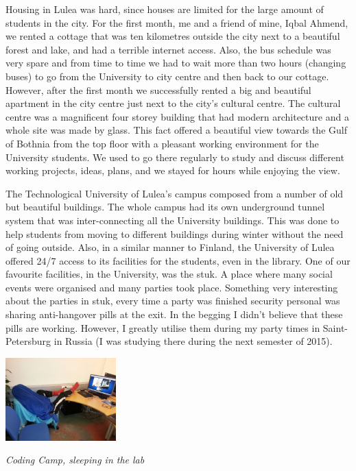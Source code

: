\documentclass[10pt,a4paper]{article} %
\begin{document}
\begin{multicols}{3}
Housing in Lulea was hard, since houses are limited for the large amount of 
students in the city. 
For the first month, me and a friend of mine, Iqbal Ahmend, we rented a cottage 
that was ten kilometres outside the city next to a beautiful forest and lake, and 
had a terrible internet access. 
Also, the bus schedule was very spare and from time to time we had to wait more 
than two hours (changing buses) to go from the University to city centre and then 
back to our cottage. 
However, after the first month we successfully rented a big and beautiful apartment 
in the city centre just next to the city's cultural centre. 
The cultural centre was a magnificent four storey building that had modern architecture and 
a whole site was made by glass. 
This fact offered a beautiful view towards the Gulf of Bothnia from the top floor with 
a pleasant working environment for the University students. 
We used to go there regularly to study and discuss different working projects, ideas, plans, 
and we stayed for hours while enjoying the view.

The Technological University of Lulea's campus composed from a number of old but 
beautiful buildings. 
The whole campus had its own underground tunnel system that was inter-connecting 
all the University buildings. 
This was done to help students from moving to different buildings during winter 
without the need of going outside. 
Also, in a similar manner to Finland, the University of Lulea offered 24/7 access 
to its facilities for the students, even in the library. 
One of our favourite facilities, in the University, was the {\sc stuk}. 
A place where many social events were organised and many parties took place.
Something very interesting about the parties in {\sc stuk}, every time a party 
was finished security personal was sharing anti-hangover pills at the exit. 
In the begging I didn't believe that these pills are working. 
However, I greatly 
utilise them during my party times in Saint-Petersburg in Russia (I was 
studying there during the next semester of 2015).



\begin{center}
	\includegraphics[width=0.32\textwidth]{media/coding_camp.jpg}
	\par\textit{Coding Camp, sleeping in the lab}
\end{center}
  


\end{multicols}
\end{document}
